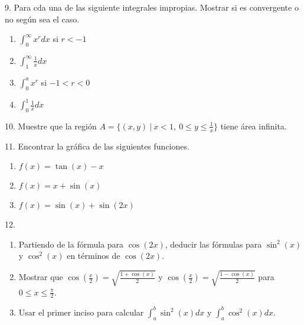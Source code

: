 \documentclass[12pt]{article}
\begin{document}
9. Para cda una de las siguiente integrales impropias. Mostrar si es convergente o no seg\'un sea el caso.

\begin{enumerate}[\hspace{9px} a)]
    \item \(\displaystyle\int_{0}^{\infty}x^rdx\) si $r<-1$
    
    \item \(\displaystyle\int_{1}^{\infty}\frac{1}{x}dx\)
    
    \item \(\displaystyle\int_{0}^{a}x^r\) si $-1<r<0$
    
    \item \(\displaystyle\int_{0}^{1}\frac{1}{x}dx\)

\end{enumerate}

10. Muestre que la regi\'on \(A=\{(x,y) \ | \ x<1, \ 0 \leq y \leq \frac{1}{x}\}\) tiene \'area infinita.

11. Encontrar la gr\'afica de las siguientes funciones.

\begin{enumerate}[\hspace{9px} a)]
    \item \(f(x)=\tan(x)-x\)
    
    \item \(f(x)=x+\sin(x)\)
    
    \item \(f(x)=\sin(x)+\sin(2x)\)

\end{enumerate}

12. 
\begin{enumerate}[\hspace{9px} a)]
    \item Partiendo de la f\'ormula para $\cos(2x)$, deducir las f\'ormulas para $\sin^2(x)$ y $\cos^2(x)$ en t\'erminos de $\cos(2x)$.
    
    \item Mostrar que \(\cos\left(\displaystyle\frac{x}{2}\right)=\sqrt{\frac{1+\cos(x)}{2}}\) y \(\cos\left(\displaystyle\frac{x}{2}\right)=\sqrt{\frac{1-\cos(x)}{2}}\) para \(0 \leq x \leq \displaystyle\frac{\pi}{2}\).
    
    \item Usar el primer inciso para calcular \(\displaystyle\int_{a}^{b}\sin^2(x)dx\) y \(\displaystyle\int_{a}^{b}\cos^2(x)dx\).

\end{enumerate}
\end{document}
